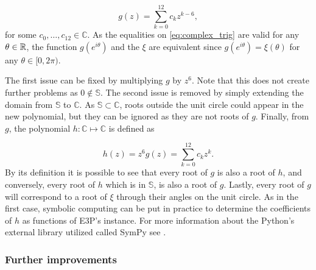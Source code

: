 \begin{equation}
g(z)=\sum_{k=0}^{12} c_k z^{k-6},
\end{equation}
for some $c_0, \dots, c_{12} \in \mathbb{C}$. As the equalities on \autoref{eq:complex_trig} are valid for any $\theta \in \mathbb{R}$, the function $g(e^{i\theta})$ and the $\xi$ are equivalent since $g(e^{i\theta}) = \xi(\theta)$ for any $\theta \in [0, 2\pi)$. 

The first issue can be fixed by multiplying $g$ by $z^6$. Note that this does not create further problems as $0\not\in \mathbb{S}$. The second issue is removed by simply extending the domain from $\mathbb{S}$ to $\mathbb{C}$. 
As $\mathbb{S} \subset \mathbb{C}$, roots outside the unit circle could appear in the new polynomial, but they can be ignored as they are not roots of $g$.
Finally, from $g$, the polynomial $h : \mathbb{C} \mapsto \mathbb{C}$ is defined as

\begin{equation}\label{eq:h}
h(z) = z^6 g(z) = \sum_{k=0}^{12} c_k z^k.
\end{equation}
By its definition it is possible to see that every root of $g$ is also a root of $h$, and conversely, every root of $h$ which is in $\mathbb{S}$, is also a root of $g$. Lastly, every root of $g$ will correspond to a root of $\xi$ through their angles on the unit circle. As in the first case, symbolic computing can be put in practice to determine the coefficients of $h$ as functions of E3P's instance. For more information about the Python's external library utilized called SymPy see .

\subsubsection{Further improvements}

